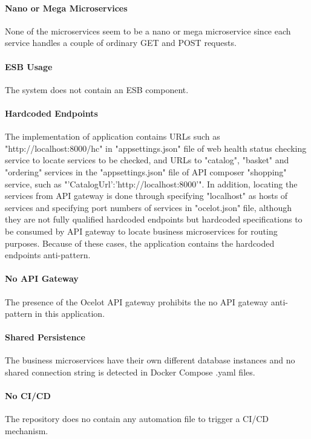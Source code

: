 \documentclass{Configuration_Files/PoliMi3i_thesis}
\begin{document}
\paragraph{Nano or Mega Microservices} None of the microservices seem to be a nano or mega microservice since each service handles a couple of ordinary GET and POST requests.

\paragraph{ESB Usage} The system does not contain an ESB component.

\paragraph{Hardcoded Endpoints} The implementation of application contains URLs such as "http://localhost:8000/hc" in "appsettings.json" file of web health status checking service to locate services to be checked, and URLs to "catalog", "basket" and "ordering" services in the "appsettings.json" file of API composer "shopping" service, such as "'CatalogUrl':'http://localhost:8000'".
In addition, locating the services from API gateway is done through specifying "localhost" as hosts of services and specifying port numbers of services in "ocelot.json" file, although they are not fully qualified hardcoded endpoints but hardcoded specifications to be consumed by API gateway to locate business microservices for routing purposes.
Because of these cases, the application contains the hardcoded endpoints anti-pattern.

\paragraph{No API Gateway} The presence of the Ocelot API gateway prohibits the no API gateway anti-pattern in this application.

\paragraph{Shared Persistence} The business microservices have their own different database instances and no shared connection string is detected in Docker Compose .yaml files.

\paragraph{No CI/CD} The repository does no contain any automation file to trigger a CI/CD mechanism.
\end{document}
